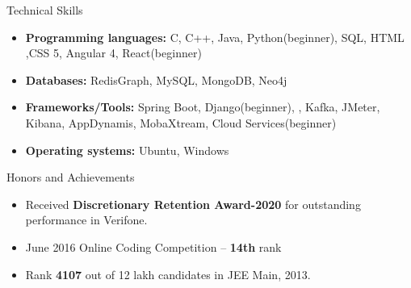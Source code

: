 \documentclass[]{twentysecondcv}
\begin{document}
\begin{cvsection}{Technical Skills}
	\begin{cvsubsection}{}{}{}
		\begin{itemize}
			\item \textbf{Programming languages:}  C, C++, Java, Python(beginner), SQL, HTML ,CSS 5, Angular 4, React(beginner)
			\item \textbf{Databases:} RedisGraph, MySQL, MongoDB, Neo4j
			\item \textbf{Frameworks/Tools:} Spring Boot, Django(beginner), , Kafka, JMeter, Kibana, AppDynamis, MobaXtream, Cloud Services(beginner)  
			\item \textbf{Operating systems:}  Ubuntu, Windows 
		 
		\end{itemize}
	\end{cvsubsection}
\end{cvsection}
\begin{cvsection}{Honors and Achievements}
	\begin{cvsubsection}{}{}{}
		\begin{itemize}
			\setlength\itemsep{3pt} 
			\item Received \textbf{Discretionary Retention Award-2020}  for outstanding performance in Verifone.
			\item June 2016 Online Coding Competition – \textbf{14th} rank
			\item Rank \textbf{4107} out of 12 lakh candidates in JEE Main, 2013.
            
		\end{itemize}
	\end{cvsubsection}
\end{cvsection}
\end{document}
